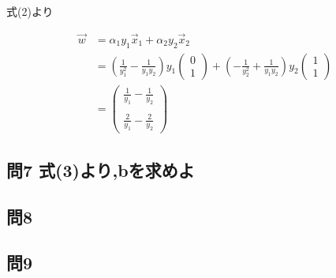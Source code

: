 \documentclass[dvipdfmx,autodetect-engine,titlepage]{jsarticle}
\begin{document}
式(2)より

\begin{align*}
  \overrightarrow{w} &= \alpha_1 y_1 \overrightarrow{x}_1 + \alpha_2 y_2 \overrightarrow{x}_2\\
  &= (\frac{1}{y_1^2} - \frac{1}{y_1 y_2}) y_1   
  \begin{pmatrix}
    0 \\
    1  
  \end{pmatrix}
  +
  (-\frac{1}{y_2^2} + \frac{1}{y_1 y_2}) y_2 
  \begin{pmatrix}
    1 \\
    1  
  \end{pmatrix}\\
  &= 
  \begin{pmatrix}
    \frac{1}{y_1} - \frac{1}{y_2} \\\\
    \frac{2}{y_1} - \frac{2}{y_2}
  \end{pmatrix}
\end{align*}

\subsection*{問7 式(3)より,bを求めよ}

\subsection*{問8}

\subsection*{問9}
\end{document}
